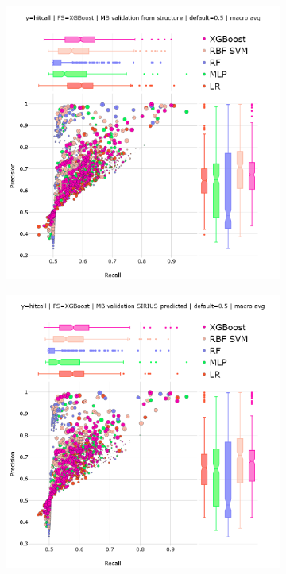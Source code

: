 \begin{figure}[h]
  \centering
  \begin{subfigure}[b]{0.495\textwidth}
      \centering
      \includegraphics[width=\textwidth]{generated_results/hitcall_classification_Feature_Selection_XGBClassifier_mb_val_structure_default_macro_avg.png}
      \caption{}
  \label{fig:hitcall_classification_Feature_Selection_XGBClassifier_mb_val_structure_default_macro_avg}
  \end{subfigure}
  \hfill
  \begin{subfigure}[b]{0.495\textwidth}
      \centering
      \includegraphics[width=\textwidth]{generated_results/hitcall_classification_Feature_Selection_XGBClassifier_mb_val_sirius_default_macro_avg.png}

\end{subfigure}
\end{figure}
